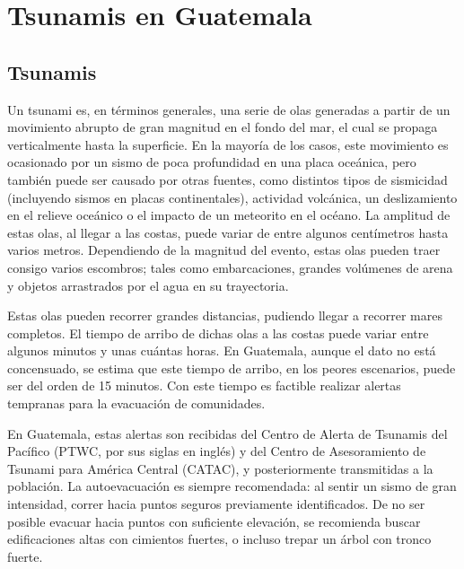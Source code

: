 \message{ !name(Tsunamis.tex)}\documentclass[TesisTotal.tex]{subfiles}
\begin{document}

\chapter{Tsunamis en Guatemala}

\section{Tsunamis}
Un tsunami es, en términos generales, una serie de olas generadas a partir de un movimiento abrupto de gran magnitud en el fondo del mar, el cual se propaga verticalmente hasta la superficie\cite{tsunamiGlossary}. En la mayoría de los casos, este movimiento es ocasionado por un sismo de poca profundidad en una placa oceánica, pero también puede ser causado por otras fuentes, como distintos tipos de sismicidad (incluyendo sismos en placas continentales), actividad volcánica, un deslizamiento en el relieve oceánico o el impacto de un meteorito en el océano\cite{posterGlobal, posterCA, OLoughlin_etal2013}.
La amplitud de estas olas, al llegar a las costas, puede variar de entre algunos centímetros hasta varios metros.
Dependiendo de la magnitud del evento, estas olas pueden traer consigo varios escombros; tales como embarcaciones, grandes volúmenes de arena y objetos arrastrados por el agua en su trayectoria\cite{tsunamiGlossary}.

Estas olas pueden recorrer grandes distancias, pudiendo llegar a recorrer mares completos\cite{tsunamiGlossary}. 
El tiempo de arribo de dichas olas a las costas puede variar entre algunos minutos y unas cu\'antas horas. En Guatemala, aunque el dato no está concensuado, se estima que este tiempo de arribo, en los peores escenarios, puede ser del orden de 15 minutos.
Con este tiempo es factible realizar alertas tempranas para la evacuación de comunidades.

En Guatemala, estas alertas son recibidas del Centro de Alerta de Tsunamis del Pacífico (PTWC, por sus siglas en inglés) y del Centro de Asesoramiento de Tsunami para América Central (CATAC), y posteriormente transmitidas a la población.
La autoevacuación es siempre recomendada\cite{PNR}: al sentir un sismo de gran intensidad, correr hacia puntos seguros previamente identificados. De no ser posible evacuar hacia puntos con suficiente elevación, se recomienda buscar edificaciones altas con cimientos fuertes, o incluso trepar un 
árbol con tronco fuerte\cite{lessonsIndonesia,lessonsCHJ}.
\end{document}
